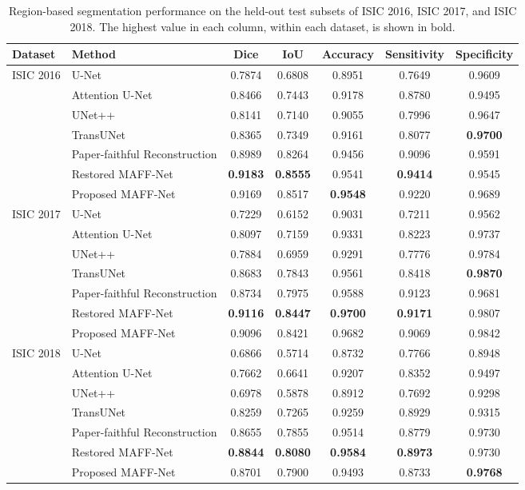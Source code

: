 \begin{table}[!t]
\centering
\caption{Region-based segmentation performance on the held-out test subsets of
ISIC 2016, ISIC 2017, and ISIC 2018. The highest value in each column, within
each dataset, is shown in bold.}
\label{tab:benchmark}
\setlength{\tabcolsep}{5pt}
\footnotesize
\begin{tabular}{llccccc}
\toprule
Dataset & Method & Dice & IoU & Accuracy & Sensitivity & Specificity \\
\midrule
\multirow{7}{*}{ISIC 2016}
 & U-Net & 0.7874 & 0.6808 & 0.8951 & 0.7649 & 0.9609 \\
 & Attention U-Net & 0.8466 & 0.7443 & 0.9178 & 0.8780 & 0.9495 \\
 & UNet++ & 0.8141 & 0.7140 & 0.9055 & 0.7996 & 0.9647 \\
 & TransUNet & 0.8365 & 0.7349 & 0.9161 & 0.8077 & \textbf{0.9700} \\
 & Paper-faithful Reconstruction & 0.8989 & 0.8264 & 0.9456 & 0.9096 & 0.9591 \\
 & Restored MAFF-Net & \textbf{0.9183} & \textbf{0.8555} & 0.9541 & \textbf{0.9414} & 0.9545 \\
 & Proposed MAFF-Net & 0.9169 & 0.8517 & \textbf{0.9548} & 0.9220 & 0.9689 \\
\midrule
\multirow{7}{*}{ISIC 2017}
 & U-Net & 0.7229 & 0.6152 & 0.9031 & 0.7211 & 0.9562 \\
 & Attention U-Net & 0.8097 & 0.7159 & 0.9331 & 0.8223 & 0.9737 \\
 & UNet++ & 0.7884 & 0.6959 & 0.9291 & 0.7776 & 0.9784 \\
 & TransUNet & 0.8683 & 0.7843 & 0.9561 & 0.8418 & \textbf{0.9870} \\
 & Paper-faithful Reconstruction & 0.8734 & 0.7975 & 0.9588 & 0.9123 & 0.9681 \\
 & Restored MAFF-Net & \textbf{0.9116} & \textbf{0.8447} & \textbf{0.9700} & \textbf{0.9171} & 0.9807 \\
 & Proposed MAFF-Net & 0.9096 & 0.8421 & 0.9682 & 0.9069 & 0.9842 \\
\midrule
\multirow{7}{*}{ISIC 2018}
 & U-Net & 0.6866 & 0.5714 & 0.8732 & 0.7766 & 0.8948 \\
 & Attention U-Net & 0.7662 & 0.6641 & 0.9207 & 0.8352 & 0.9497 \\
 & UNet++ & 0.6978 & 0.5878 & 0.8912 & 0.7692 & 0.9298 \\
 & TransUNet & 0.8259 & 0.7265 & 0.9259 & 0.8929 & 0.9315 \\
 & Paper-faithful Reconstruction & 0.8655 & 0.7855 & 0.9514 & 0.8779 & 0.9730 \\
 & Restored MAFF-Net & \textbf{0.8844} & \textbf{0.8080} & \textbf{0.9584} & \textbf{0.8973} & 0.9730 \\
 & Proposed MAFF-Net & 0.8701 & 0.7900 & 0.9493 & 0.8733 & \textbf{0.9768} \\
\bottomrule
\end{tabular}
\end{table}

